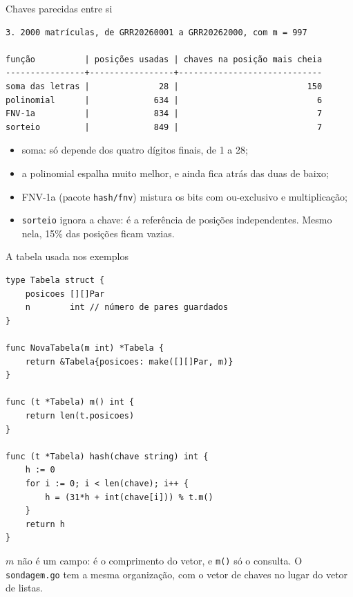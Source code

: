 \documentclass{beamer}
\begin{document}
\begin{frame}[fragile]{Chaves parecidas entre si}
	\begin{verbatim}
3. 2000 matrículas, de GRR20260001 a GRR20262000, com m = 997

função          | posições usadas | chaves na posição mais cheia
----------------+-----------------+-----------------------------
soma das letras |              28 |                          150
polinomial      |             634 |                            6
FNV-1a          |             834 |                            7
sorteio         |             849 |                            7
\end{verbatim}

	\vspace{0.1cm}
	\begin{itemize}
		\item soma: só depende dos quatro dígitos finais, de 1 a 28;
		\item a polinomial espalha muito melhor, e ainda fica atrás das duas de
		      baixo;
		\item FNV-1a (pacote \texttt{hash/fnv}) mistura os bits com ou-exclusivo e
		      multiplicação;
		\item \texttt{sorteio} ignora a chave: é a referência de posições
		      independentes. Mesmo nela, 15\% das posições ficam vazias.
	\end{itemize}
\end{frame}

\begin{frame}[fragile]{A tabela usada nos exemplos}
	\begin{verbatim}
type Tabela struct {
	posicoes [][]Par
	n        int // número de pares guardados
}

func NovaTabela(m int) *Tabela {
	return &Tabela{posicoes: make([][]Par, m)}
}

func (t *Tabela) m() int {
	return len(t.posicoes)
}

func (t *Tabela) hash(chave string) int {
	h := 0
	for i := 0; i < len(chave); i++ {
		h = (31*h + int(chave[i])) % t.m()
	}
	return h
}
\end{verbatim}

	\vspace{-0.2cm}
	\footnotesize $m$ não é um campo: é o comprimento do vetor, e \texttt{m()} só o
	consulta. O \texttt{sondagem.go} tem a mesma organização, com o vetor de chaves
	no lugar do vetor de listas.
\end{frame}
\end{document}
